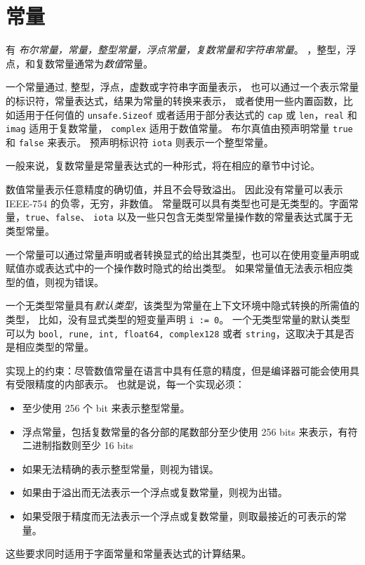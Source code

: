 
\chapter{常量}
有 \emph{布尔常量，\rune 常量，整型常量，浮点常量，复数常量和字符串常量}。
\rune，整型，浮点，和复数常量通常为\emph{数值}常量。

一个常量通过\rune, 整型，浮点，虚数或字符串字面量表示，
也可以通过一个表示常量的标识符，常量表达式，结果为常量的转换来表示，
或者使用一些内置函数，比如适用于任何值的 \lstinline|unsafe.Sizeof| 或者适用于部分表达式的 \lstinline|cap| 或 \lstinline|len|，\lstinline|real| 和 \lstinline|imag| 适用于复数常量，
\lstinline|complex| 适用于数值常量。
布尔真值由预声明常量 \lstinline|true| 和 \lstinline|false| 来表示。
预声明标识符 \lstinline|iota| 则表示一个整型常量。

一般来说，复数常量是常量表达式的一种形式，将在相应的章节中讨论。

数值常量表示任意精度的确切值，并且不会导致溢出。
因此没有常量可以表示 IEEE-754 的负零，无穷，非数值。
常量既可以具有类型也可是无类型的。字面常量，\lstinline|true|、\lstinline|false|、 \lstinline|iota| 以及一些只包含无类型常量操作数的常量表达式属于无类型常量。

一个常量可以通过常量声明或者转换显式的给出其类型，也可以在使用变量声明或赋值亦或表达式中的一个操作数时隐式的给出类型。
如果常量值无法表示相应类型的值，则视为错误。

一个无类型常量具有\emph{默认类型}，该类型为常量在上下文环境中隐式转换的所需值的类型，
比如，没有显式类型的短变量声明 \lstinline|i := 0|。
一个无类型常量的默认类型可以为 \lstinline|bool, rune, int, float64, complex128| 或者 \lstinline|string|，这取决于其是否是相应类型的常量。

实现上的约束：尽管数值常量在语言中具有任意的精度，但是编译器可能会使用具有受限精度的内部表示。
也就是说，每一个实现必须：
\begin{itemize}
\item 至少使用 256 个 bit 来表示整型常量。
\item 浮点常量，包括复数常量的各分部的尾数部分至少使用 256 bits 来表示，有符二进制指数则至少 16 bits
\item 如果无法精确的表示整型常量，则视为错误。
\item 如果由于溢出而无法表示一个浮点或复数常量，则视为出错。
\item 如果受限于精度而无法表示一个浮点或复数常量，则取最接近的可表示的常量。
\end{itemize}
这些要求同时适用于字面常量和常量表达式的计算结果。
